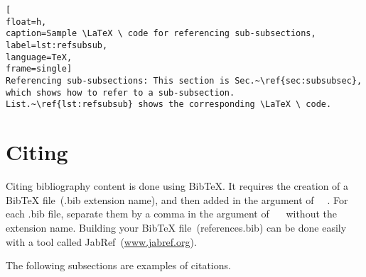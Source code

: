 \begin{lstlisting}[
float=h,
caption=Sample \LaTeX \ code for referencing sub-subsections, 
label=lst:refsubsub,
language=TeX,
frame=single]
Referencing sub-subsections: This section is Sec.~\ref{sec:subsubsec}, which shows how to refer to a sub-subsection. List.~\ref{lst:refsubsub} shows the corresponding \LaTeX \ code. 
\end{lstlisting}

\graytx{\blindtext}
\cleardoublepage





\newpage
\section{Citing}
\label{sec:cit}

Citing bibliography content is done using BibTeX. It requires the creation of a BibTeX file~(.bib extension name), and then added in the argument of \verb|  |. For each .bib file, separate them by a comma in the argument of \verb|  | without the extension name. Building your BibTeX file~(references.bib) can be done easily with a tool called JabRef~(\url{www.jabref.org}).

The following subsections are examples of citations.



